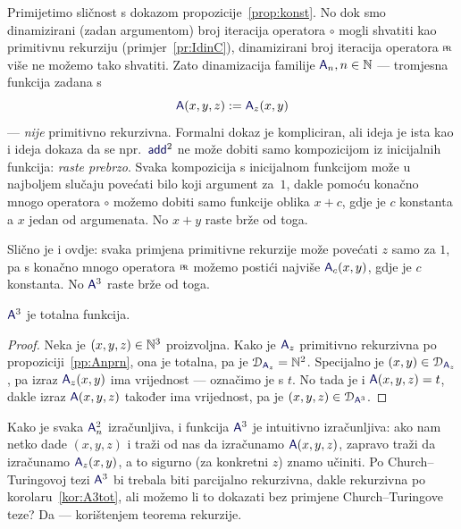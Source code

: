 Primijetimo sličnost s dokazom propozicije~\ref{prop:konst}. No dok smo dinamizirani (zadan argumentom) broj iteracija operatora $\circ$ mogli shvatiti kao primitivnu rekurziju (primjer~\ref{pr:IdinC}), dinamizirani broj iteracija operatora $\pr$ više ne možemo tako shvatiti. Zato dinamizacija familije $\f A_n,n\in\N$ --- tromjesna funkcija zadana s
\begin{equation}
    \f A(x,y,z):=\f A_z(x,y)%
\end{equation}
{} --- \emph{nije} primitivno rekurzivna. Formalni dokaz je kompliciran, ali ideja je ista kao i ideja dokaza da se npr.\ $\f{add}^2$ ne može dobiti samo kompozicijom iz inicijalnih funkcija: \emph{raste prebrzo}. Svaka kompozicija s inicijalnom funkcijom može u najboljem slučaju povećati bilo koji argument za~$1$, dakle pomoću konačno mnogo operatora $\circ$ možemo dobiti samo funkcije oblika $x+c$, gdje je $c$ konstanta a $x$ jedan od argumenata. No $x+y$ raste brže od toga.

Slično je i ovdje: svaka primjena primitivne rekurzije može povećati $z$ samo za $1$, pa s konačno mnogo operatora $\pr$ možemo postići najviše $\f A_c(x,y)$, gdje je $c$ konstanta. No $\f A^3$ raste brže od toga.

\begin{korolar}[{name=[totalnost Ackermannove funkcije]}]\label{kor:A3tot}
$\f A^3$ je totalna funkcija.
\end{korolar}
\begin{proof}
Neka je $(x,y,z)\in{\mathbb N}^3$ proizvoljna. Kako je $\f A_z$ primitivno rekurzivna po propoziciji~\ref{pp:Anprn}, ona je totalna, pa je $\dom{\f A_z}=\N^2$. Specijalno je $(x,y)\in\dom{\f A_z}$, pa izraz $\f A_z(x,y)$ ima vrijednost --- označimo je s $t$. No tada je i $\f A(x,y,z)=t$, dakle izraz $\f A(x,y,z)$ također ima vrijednost, pa je $(x,y,z)\in\dom{\f A^3}$.
\end{proof}

Kako je svaka $\f A_n^2$ izračunljiva, i funkcija $\f A^3$ je intuitivno izračunljiva: ako nam netko dade $(x,y,z)$ i traži od nas da izračunamo $\f A(x,y,z)$, zapravo traži da izračunamo $\f A_z(x,y)$, a to sigurno (za konkretni $z$) znamo učiniti. Po Church--\!Turingovoj tezi $\f A^3$ bi trebala biti parcijalno rekurzivna, dakle rekurzivna po korolaru~\ref{kor:A3tot}, ali možemo li to dokazati bez primjene Church--\!Turingove teze? Da --- korištenjem teorema rekurzije.

